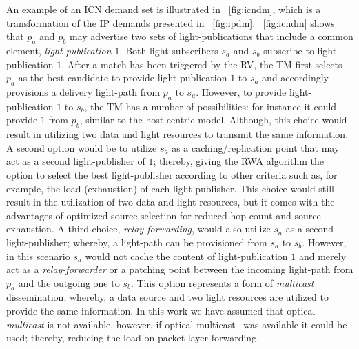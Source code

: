 \documentclass[journal]{IEEEtran}
\begin{document}
An example of an ICN demand set is illustrated in
\figurename~\ref{fig:icndm}, which is a transformation of the IP
demands presented in
\figurename~\ref{fig:ipdm}. \figurename~\ref{fig:icndm} shows that
$p_a$ and $p_b$ may advertise two sets of light-publications that
include a common element, \emph{light-publication $1$}. Both
light-subscribers $s_a$ and $s_b$ subscribe to light-publication
$1$. After a match has been triggered by the RV, the TM first selects
$p_a$ as the best candidate to provide light-publication $1$ to $s_a$
and accordingly provisions a delivery light-path from $p_a$ to
$s_a$. However, to provide light-publication $1$ to $s_b$, the TM has
a number of possibilities: for instance it could provide $1$ from
$p_b$, similar to the host-centric model. Although, this choice would
result in utilizing two data and light resources to transmit the same
information. A second option would be to utilize $s_a$ as a
caching/replication point that may act as a second light-publisher of
$1$; thereby, giving the RWA algorithm the option to select the best
light-publisher according to other criteria such as, for example, the
load (exhaustion) of each light-publisher. This choice would still
result in the utilization of two data and light resources, but it
comes with the advantages of optimized source selection for reduced
hop-count and source exhaustion. A third choice,
\emph{relay-forwarding}, would also utilize $s_a$ as a second
light-publisher; whereby, a light-path can be provisioned from $s_a$
to $s_b$. However, in this scenario $s_a$ would not cache the content
of light-publication $1$ and merely act as a \emph{relay-forwarder} or a patching
point between the incoming light-path from $p_a$ and the outgoing one
to $s_b$. This option represents a form of \emph{multicast}
dissemination; whereby, a data source and two light
resources are utilized to provide the same information. In this work
we have assumed that optical \emph{multicast} is not available,
however, if optical multicast~\cite{cha:omc} was available it could be
used; thereby, reducing the load on packet-layer forwarding. 
 
\end{document}
